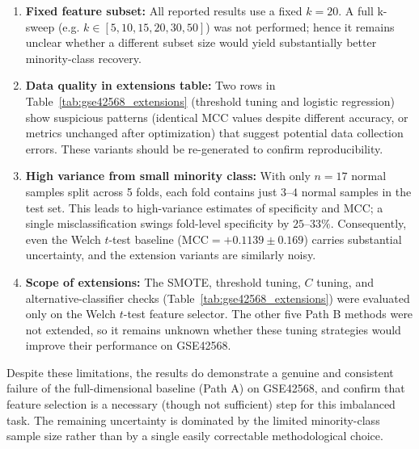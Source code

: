 \begin{enumerate}
    \item \textbf{Fixed feature subset:} All reported results use a fixed $k = 20$. A full k-sweep (e.g. $k \in [5, 10, 15, 20, 30, 50]$) was not performed; hence it remains unclear whether a different subset size would yield substantially better minority-class recovery.
    
    \item \textbf{Data quality in extensions table:} Two rows in Table~\ref{tab:gse42568_extensions} (threshold tuning and logistic regression) show suspicious patterns (identical MCC values despite different accuracy, or metrics unchanged after optimization) that suggest potential data collection errors. These variants should be re-generated to confirm reproducibility.
    
    \item \textbf{High variance from small minority class:} With only $n=17$ normal samples split across 5 folds, each fold contains just $3$--$4$ normal samples in the test set. This leads to high-variance estimates of specificity and MCC; a single misclassification swings fold-level specificity by $25$--$33\%$. Consequently, even the Welch $t$-test baseline ($\text{MCC} = +0.1139 \pm 0.169$) carries substantial uncertainty, and the extension variants are similarly noisy.
    
    \item \textbf{Scope of extensions:} The SMOTE, threshold tuning, $C$ tuning, and alternative-classifier checks (Table~\ref{tab:gse42568_extensions}) were evaluated only on the Welch $t$-test feature selector. The other five Path B methods were not extended, so it remains unknown whether these tuning strategies would improve their performance on GSE42568.
\end{enumerate}

Despite these limitations, the results do demonstrate a genuine and consistent failure of the full-dimensional baseline (Path A) on GSE42568, and confirm that feature selection is a necessary (though not sufficient) step for this imbalanced task. The remaining uncertainty is dominated by the limited minority-class sample size rather than by a single easily correctable methodological choice.